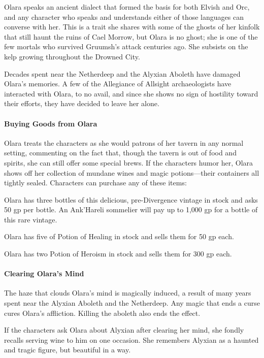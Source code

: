 \documentclass[10pt,a4paper,twoside,bg=print,twocolumn,openany,nodeprecatedcode]{dndbook}
\begin{document}
Olara speaks an ancient dialect that formed the basis for both Elvish and Orc, and any character who speaks and understands either of those languages can converse with her. This is a trait she shares with some of the ghosts of her kinfolk that still haunt the ruins of Cael Morrow, but Olara is no ghost; she is one of the few mortals who survived Gruumsh's attack centuries ago. She subsists on the kelp growing throughout the Drowned City.

Decades spent near the Netherdeep and the Alyxian Aboleth have damaged Olara's memories. A few of the Allegiance of Allsight archaeologists have interacted with Olara, to no avail, and since she shows no sign of hostility toward their efforts, they have decided to leave her alone.

\paragraph{Buying Goods from Olara}
Olara treats the characters as she would patrons of her tavern in any normal setting, commenting on the fact that, though the tavern is out of food and spirits, she can still offer some special brews. If the characters humor her, Olara shows off her collection of mundane wines and magic potions—their containers all tightly sealed. Characters can purchase any of these items:


\begin{description}[nolistsep]
\item[Magically Preserved Wine.]
Olara has three bottles of this delicious, pre-Divergence vintage in stock and asks 50 gp per bottle. An Ank'Hareli sommelier will pay up to 1,000 gp for a bottle of this rare vintage.
\item[Potions of Healing.]
Olara has five of Potion of Healing in stock and sells them for 50 gp each.
\item[Potions of Heroism.]
Olara has two Potion of Heroism in stock and sells them for 300 gp each.
\end{description}

\paragraph{Clearing Olara's Mind}
The haze that clouds Olara's mind is magically induced, a result of many years spent near the Alyxian Aboleth and the Netherdeep. Any magic that ends a curse cures Olara's affliction. Killing the aboleth also ends the effect.

If the characters ask Olara about Alyxian after clearing her mind, she fondly recalls serving wine to him on one occasion. She remembers Alyxian as a haunted and tragic figure, but beautiful in a way.
\end{document}
